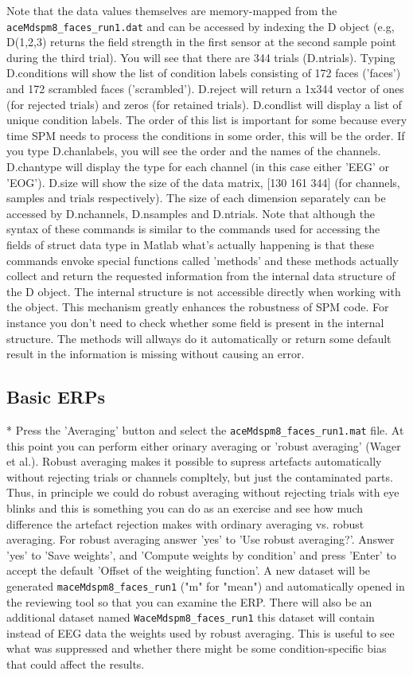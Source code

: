 Note that the data values themselves are memory-mapped from the \verb!aceMdspm8_faces_run1.dat! and can be accessed by indexing the D object (e.g, D(1,2,3) returns the field strength in the first sensor at the second sample point during the third trial). You will see that there are 344 trials (D.ntrials). Typing D.conditions will show the list of condition labels consisting of 172 faces ('faces') and 172 scrambled faces ('scrambled'). D.reject will return a 1x344 vector of ones (for rejected trials) and zeros (for retained trials). D.condlist will display a list of unique condition labels. The order of this list is important for some because every time SPM needs to process the conditions in some order, this will be the order. If you type D.chanlabels, you will see the order and the names of the channels. D.chantype will display the type for each channel (in this case either 'EEG' or 'EOG'). D.size will show the size of the data matrix, [130 161 344] (for channels, samples and trials respectively). The size of each dimension separately can be accessed by D.nchannels, D.nsamples and D.ntrials. Note that although the syntax of these commands is similar to the commands used for accessing the fields of struct data type in Matlab what's actually happening is that these commands envoke special functions called 'methods' and these methods actually collect and return the requested information from the internal data structure of the D object. The internal structure is not accessible directly when working with the object. This mechanism greatly enhances the robustness of SPM code. For instance you don't need to check whether some field is present in the internal structure. The methods will allways do it automatically or return some default result in the information is missing without causing an error.


\subsection{Basic ERPs}

* Press the 'Averaging' button and select the \verb!aceMdspm8_faces_run1.mat! file. At this point you can perform either orinary averaging or 'robust averaging' (Wager et al.). Robust averaging makes it possible to supress artefacts automatically without rejecting trials or channels compltely, but just the contaminated parts. Thus, in principle we could do robust averaging without rejecting trials with eye blinks and this is something you can do as an exercise and see how much difference the artefact rejection makes with ordinary averaging vs. robust averaging. For robust averaging answer 'yes' to 'Use robust averaging?'. Answer 'yes' to 'Save weights', and 'Compute weights by condition' and press 'Enter' to accept the default 'Offset of the weighting function'. A new dataset will be generated \verb!maceMdspm8_faces_run1! ("m" for "mean") and automatically opened in the reviewing tool so that you can examine the ERP. There will also be an additional dataset named \verb!WaceMdspm8_faces_run1! this dataset will contain instead of EEG data the weights used by robust averaging. This is useful to see what was suppressed and whether there might be some condition-specific bias that could affect the results. 

